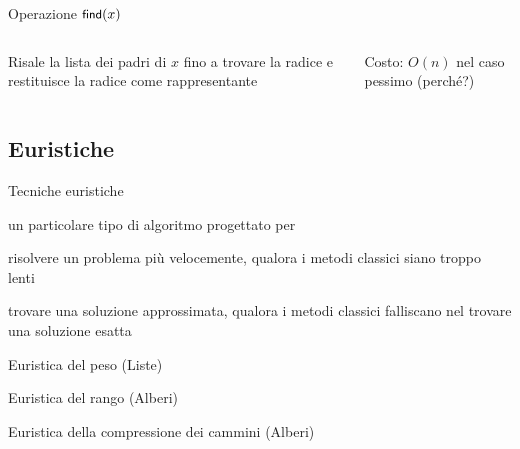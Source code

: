 \begin{frame}{Operazione $\textsf{{\small find}}(x)$}

\vspace{-9pt}
\begin{columns}[T]
\BIL
\item Risale la lista dei padri di $x$ fino a trovare la radice e 
restituisce la radice come rappresentante
\item Costo: $O(n)$ nel caso pessimo (perché?)
\EIL
{}
\vspace{-9pt}
\end{columns}

\end{frame}

\subsection{Euristiche}

\begin{frame}{Tecniche euristiche}

\vspace{-9pt}
\begin{myboxtitle}
\EE un particolare tipo di algoritmo progettato per 
\BI
\item risolvere un problema  più velocemente, qualora i metodi classici 
siano troppo lenti
\item trovare una soluzione approssimata, qualora i metodi classici 
falliscano nel trovare una soluzione esatta
\EI
\end{myboxtitle}

\begin{myboxtitle}
\BIL
\item Euristica del \alert{peso} (Liste)
\item Euristica del \alert{rango} (Alberi)
\item Euristica della \alert{compressione dei cammini} (Alberi)
\EIL
\end{myboxtitle}

\end{frame}


